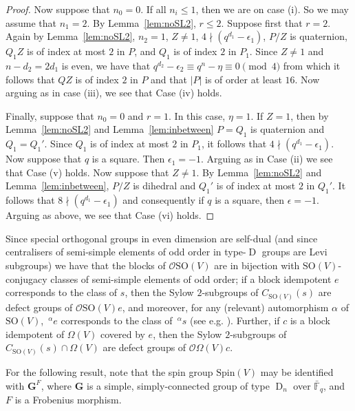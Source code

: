 \documentclass{amsart}
\theoremstyle{plain}\newtheorem{Theorem}{Theorem}[section]
\theoremstyle{plain}\newtheorem{Conjecture}[Theorem]{Conjecture}
\theoremstyle{plain}\newtheorem{Corollary}[Theorem]{Corollary}
\theoremstyle{plain}\newtheorem{Lemma}[Theorem]{Lemma}
\theoremstyle{plain}\newtheorem{Proposition}[Theorem]{Proposition}
\theoremstyle{definition}\newtheorem{Definition}[Theorem]{Definition}
\theoremstyle{definition}\newtheorem{Example}[Theorem]{Example}
\theoremstyle{definition}\newtheorem{Examples}[Theorem]{Examples}
\theoremstyle{definition}\newtheorem{Exercise}[Theorem]{Exercise}
\theoremstyle{definition}\newtheorem{Notation}[Theorem]{Notation}
\theoremstyle{definition}\newtheorem{Remark}[Theorem]{Remark}
\theoremstyle{definition}\newtheorem{Remarks}[Theorem]{Remarks}
\def\CO{{\mathcal{O}}}    \def\OPE{{\mathcal{O}(P\rtimes E)}}
\def\SO{\mathrm{SO}}
\def\Spin{\mathrm{Spin}}
\newcommand{\bG}{{\mathbf{G}}}
\newcommand{\type}{\operatorname}
\numberwithin{equation}{section}
\begin{document}
\begin{proof}
Now suppose that $n_0=0$.  If  all $n_i \leq 1 $, then we are on case  (i).  So we may assume that $n_1=2 $. By Lemma~\ref{lem:noSL2},  $r \leq 2 $.   Suppose first that $r=2 $.  Again by Lemma~\ref{lem:noSL2},  $n_2=1$,  $Z \ne 1 $,   $4\nmid (q^{d_1}-\epsilon_1) $,   $P/Z$ is quaternion,  $Q_1  Z$ is  of index  at  most $2$  in  $P$, and $  Q_1  $ is  of index $2$  in  $P_1 $.
Since  $Z \ne 1$  and $n - d_2 =2d_1$ is  even, we have that   $q^{d_2}- \epsilon_2 \equiv     q^{n} - \eta  \equiv 0 \pmod 4$  from which it follows  that $QZ$ is of index $2$ in  $P$  and that $|P|$  is  of order at least $16$.
Now arguing as in case (iii), we see that Case (iv) holds.

Finally, suppose that  $n_0=0 $  and $r=1 $. In this case, $\eta=1$.  If $Z =1 $, then by  Lemma~\ref{lem:noSL2}  and Lemma~\ref{lem:inbetween} $P=Q_1$ is quaternion and  $Q_1= Q_1' $. Since  $Q_1 $ is of index at most $2$ in $P_1$, it follows that 
$ 4 \nmid  (q^{d_1}-\epsilon_1)$.  Now suppose that   $q$ is  a square.   Then $\epsilon_1 =-1 $.   Arguing   as in Case (ii)   we see that   Case (v) holds.     Now suppose that  $Z \ne 1  $.  By  Lemma~\ref{lem:noSL2} and  Lemma~\ref{lem:inbetween}, $P/Z $ is dihedral  and $Q_1'$ is  of index at most  $2$ in $ Q_1' $. It follows that $ 8 \nmid  (q^{d_1}-\epsilon_1)$  and consequently if $q$ is a square, then  $\epsilon=-1 $.  Arguing as above, we see that Case (vi) holds.\end{proof}


Since special orthogonal groups in   even dimension are self-dual   (and  since centralisers of semi-simple elements  of odd order in type-$\type{D}$ groups  are Levi subgroups)  we have  that the  blocks of $\CO \SO(V)$ are  in  bijection  with $\SO(V)$-conjugacy classes of semi-simple elements  of   odd order; if a  block  idempotent  $e$  corresponds to the class of $s$, then  the   Sylow $2$-subgroups   of $C_{\SO(V)}(s)$  are  defect groups of $\CO \SO(V) e$, and moreover,  for any  (relevant)   automorphism  $\alpha $ of $\SO(V)$,  $\,^\alpha e   $  corresponds to   the class of $\,^\alpha  s$  (see e.g. \cite[Prop.~7.2]{taylor18}).  Further, if $c$  is a  block idempotent  of $\Omega (V)  $ covered by  $e$, then   the Sylow $2$-subgroups of $C_{\SO(V)}(s) \cap \Omega (V)$ are     defect groups of  $\CO \Omega (V) c$.

For the following  result,  note that the spin group $\Spin(V)$   may be identified  with $\bG^F$, where $\bG$ is  a simple, simply-connected group  of type $\type{D}_{n}$ over  $\bar{\mathbb F}_q$, and $F$ is  a Frobenius morphism.  
\end{document}

